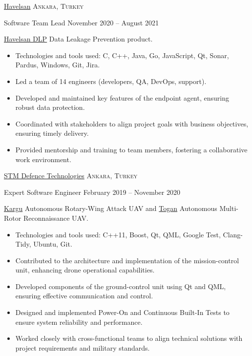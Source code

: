 \documentclass[10pt,a4paper]{article}
\begin{document}
\vspace{0.3cm}

\headedsection
{\href{https://havelsan.com.tr/en}{Havelsan}}
{\textsc{Ankara, Turkey}}{
    \headedsubsection
    {Software Team Lead}
    {November 2020 -- August 2021}
    {
        \bodytext
        {
            \href{https://havelsan.com.tr/en/sectors/cyber-security/cyber-security/products/havelsan-dlp}{Havelsan DLP} Data Leakage Prevention product.
            \begin{itemize}
                \item Technologies and tools used: C, C++, Java, Go, JavaScript, Qt, Sonar, Pardus, Windows, Git, Jira.
                \item Led a team of 14 engineers (developers, QA, DevOps, support).
                \item Developed and maintained key features of the endpoint agent, ensuring robust data protection.
                \item Coordinated with stakeholders to align project goals with business objectives, ensuring timely delivery.
                \item Provided mentorship and training to team members, fostering a collaborative work environment.
            \end{itemize}
        }
    }
}

\vspace{0.3cm}

\headedsection
{\href{https://www.stm.com.tr/en}{STM Defence Technologies}}
{\textsc{Ankara, Turkey}}{
    \headedsubsection
    {Expert Software Engineer}
    {February 2019 -- November 2020}
    {
        \bodytext
        {
            \href{https://www.stm.com.tr/en/kargu-autonomous-tactical-multi-rotor-attack-uav}{Kargu} Autonomous Rotary-Wing Attack UAV and \href{https://www.stm.com.tr/en/togan}{Togan} Autonomous Multi-Rotor Reconnaissance UAV.
            \begin{itemize}
                \item Technologies and tools used: C++11, Boost, Qt, QML, Google Test, Clang-Tidy, Ubuntu, Git.
                \item Contributed to the architecture and implementation of the mission-control unit, enhancing drone operational capabilities.
                \item Developed components of the ground-control unit using Qt and QML, ensuring effective communication and control.
                \item Designed and implemented Power-On and Continuous Built-In Tests to ensure system reliability and performance.
                \item Worked closely with cross-functional teams to align technical solutions with project requirements and military standards.
            \end{itemize}
        }
    }
}
\end{document}
